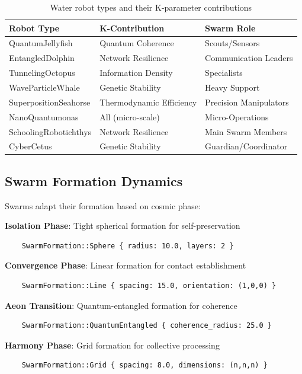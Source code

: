 \documentclass[12pt,a4paper]{article}
\begin{document}
\begin{table}[H]
\centering
\begin{tabular}{lll}
\toprule
\textbf{Robot Type} & \textbf{K-Contribution} & \textbf{Swarm Role} \\
\midrule
QuantumJellyfish & Quantum Coherence & Scouts/Sensors \\
EntangledDolphin & Network Resilience & Communication Leaders \\
TunnelingOctopus & Information Density & Specialists \\
WaveParticleWhale & Genetic Stability & Heavy Support \\
SuperpositionSeahorse & Thermodynamic Efficiency & Precision Manipulators \\
NanoQuantumonas & All (micro-scale) & Micro-Operations \\
SchoolingRobotichthys & Network Resilience & Main Swarm Members \\
CyberCetus & Genetic Stability & Guardian/Coordinator \\
\bottomrule
\end{tabular}
\caption{Water robot types and their K-parameter contributions}
\end{table}

\subsection{Swarm Formation Dynamics}

Swarms adapt their formation based on cosmic phase:

\textbf{Isolation Phase}: Tight spherical formation for self-preservation
\begin{verbatim}
    SwarmFormation::Sphere { radius: 10.0, layers: 2 }
\end{verbatim}

\textbf{Convergence Phase}: Linear formation for contact establishment
\begin{verbatim}
    SwarmFormation::Line { spacing: 15.0, orientation: (1,0,0) }
\end{verbatim}

\textbf{Aeon Transition}: Quantum-entangled formation for coherence
\begin{verbatim}
    SwarmFormation::QuantumEntangled { coherence_radius: 25.0 }
\end{verbatim}

\textbf{Harmony Phase}: Grid formation for collective processing
\begin{verbatim}
    SwarmFormation::Grid { spacing: 8.0, dimensions: (n,n,n) }
\end{verbatim}
\end{document}
